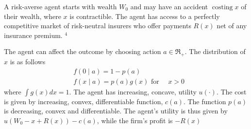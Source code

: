 \documentclass[answers]{exam}
\begin{document}
\begin{questions}
\question A risk-averse agent starts with wealth $W_0$ and may have an accident $\operatorname{costing} x$ of their wealth, where $x$ is contractible. The agent has access to a perfectly competitive market of risk-neutral insurers who offer payments $R(x)$ net of any insurance premium. ${ }^4$

The agent can affect the outcome by choosing action $a \in \Re_{+}$. The distribution of $x$ is as follows
$$
\begin{aligned}
& f(0 \mid a)=1-p(a) \\
& f(x \mid a)=p(a) g(x) \text { for } \quad x>0
\end{aligned}
$$
where $\int g(x) d x=1$. The agent has increasing, concave, utility $u(\cdot)$. The cost is given by increasing, convex, differentiable function, $c(a)$. The function $p(a)$ is decreasing, convex and differentiable. The agent's utility is thus given by $u\left(W_0-x+R(x)\right)-c(a)$, while the firm's profit is $-R(x)$
\end{questions}
\end{document}
